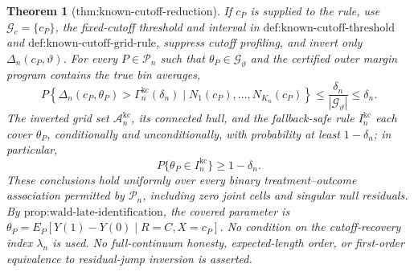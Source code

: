 \documentclass{article}
\newtheorem{theorem}{Theorem}
\begin{document}
\begin{theorem}[thm:known-cutoff-reduction]\label{thm:known-cutoff-reduction}
If \(c_P\) is supplied to the rule, use \(\mathcal G_c=\{c_P\}\), the fixed-cutoff threshold and interval in \(\text{def:known-cutoff-threshold}\) and \(\text{def:known-cutoff-grid-rule}\), suppress cutoff profiling, and invert only \(\Delta_n(c_P,\vartheta)\). For every \(P\in\mathcal P_n\) such that \(\theta_P\in\mathcal G_\vartheta\) and the certified outer margin program contains the true bin averages, \[P\!\left\{\Delta_n(c_P,\theta_P)>\Gamma_n^{\mathrm{kc}}(\delta_n)\mid N_1(c_P),\ldots,N_{K_n}(c_P)\right\}\le\frac{\delta_n}{|\mathcal G_\vartheta|}\le\delta_n.\] The inverted grid set \(\mathcal A_n^{\mathrm{kc}}\), its connected hull, and the fallback-safe rule \(I_n^{\mathrm{kc}}\) each cover \(\theta_P\), conditionally and unconditionally, with probability at least \(1-\delta_n\); in particular, \[P\{\theta_P\in I_n^{\mathrm{kc}}\}\ge1-\delta_n.\] These conclusions hold uniformly over every binary treatment--outcome association permitted by \(\mathcal P_n\), including zero joint cells and singular null residuals. By \(\text{prop:wald-late-identification}\), the covered parameter is \(\theta_P=E_P[Y(1)-Y(0)\mid R=C,X=c_P]\). No condition on the cutoff-recovery index \(\lambda_n\) is used. No full-continuum honesty, expected-length order, or first-order equivalence to residual-jump inversion is asserted.
\end{theorem}
\end{document}
